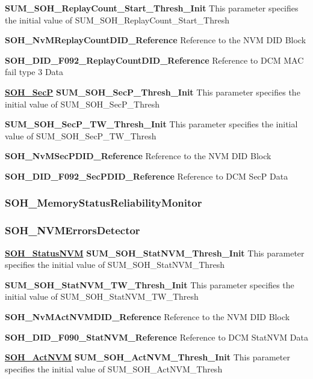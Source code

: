 \textbf{SUM\_SOH\_ReplayCount\_Start\_Thresh\_Init}\newline
This parameter specifies the initial value of SUM\_SOH\_ReplayCount\_Start\_Thresh

\textbf{SOH\_NvMReplayCountDID\_Reference}\newline
Reference to the NVM DID Block

\textbf{SOH\_DID\_F092\_ReplayCountDID\_Reference}\newline
Reference to DCM MAC fail type 3 Data

\textbf{\underline{SOH\_SecP}}\newline
\textbf{SUM\_SOH\_SecP\_Thresh\_Init}\newline
This parameter specifies the initial value of SUM\_SOH\_SecP\_Thresh

\textbf{SUM\_SOH\_SecP\_TW\_Thresh\_Init}\newline
This parameter specifies the initial value of SUM\_SOH\_SecP\_TW\_Thresh

\textbf{SOH\_NvMSecPDID\_Reference}\newline
Reference to the NVM DID Block

\textbf{SOH\_DID\_F092\_SecPDID\_Reference}\newline
Reference to DCM SecP Data

\subsubsection{\textbf{SOH\_MemoryStatusReliabilityMonitor}}
\subsubsection{SOH\_NVMErrorsDetector}
\textbf{\underline{SOH\_StatusNVM}}\newline
\textbf{SUM\_SOH\_StatNVM\_Thresh\_Init}\newline
This parameter specifies the initial value of SUM\_SOH\_StatNVM\_Thresh


\textbf{SUM\_SOH\_StatNVM\_TW\_Thresh\_Init}\newline
This parameter specifies the initial value of SUM\_SOH\_StatNVM\_TW\_Thresh


\textbf{SOH\_NvMActNVMDID\_Reference}\newline
Reference to the NVM DID Block

\textbf{SOH\_DID\_F090\_StatNVM\_Reference}\newline
Reference to DCM StatNVM Data

\textbf{\underline{SOH\_ActNVM}}\newline
\textbf{SUM\_SOH\_ActNVM\_Thresh\_Init}\newline
This parameter specifies the initial value of SUM\_SOH\_ActNVM\_Thresh


